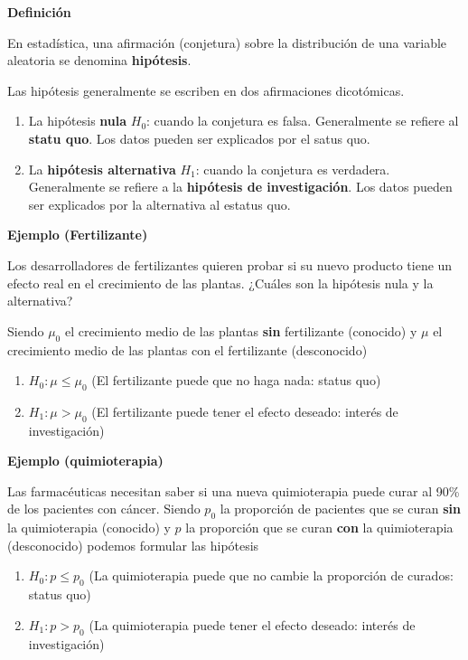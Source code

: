 \documentclass[
]{book}
\providecommand{\tightlist}{%
  \setlength{\itemsep}{0pt}\setlength{\parskip}{0pt}}
\begin{document}
\textbf{Definición}

En estadística, una afirmación (conjetura) sobre la distribución de una variable aleatoria se denomina \textbf{hipótesis}.

Las hipótesis generalmente se escriben en dos afirmaciones dicotómicas.

\begin{enumerate}
\def\labelenumi{\alph{enumi}.}
\item
  La hipótesis \textbf{nula} \(H_0\): cuando la conjetura es falsa. Generalmente se refiere al \textbf{statu quo}. Los datos pueden ser explicados por el satus quo.
\item
  La \textbf{hipótesis alternativa} \(H_1\): cuando la conjetura es verdadera. Generalmente se refiere a la \textbf{hipótesis de investigación}. Los datos pueden ser explicados por la alternativa al estatus quo.
\end{enumerate}

\textbf{Ejemplo (Fertilizante)}

Los desarrolladores de fertilizantes quieren probar si su nuevo producto tiene un efecto real en el crecimiento de las plantas. ¿Cuáles son la hipótesis nula y la alternativa?

Siendo \(\mu_0\) el crecimiento medio de las plantas \textbf{sin} fertilizante (conocido) y \(\mu\) el crecimiento medio de las plantas con el fertilizante (desconocido)

\begin{enumerate}
\def\labelenumi{\alph{enumi}.}
\tightlist
\item
  \(H_0:\mu \leq \mu_0\) (El fertilizante puede que no haga nada: status quo)
\item
  \(H_1:\mu > \mu_0\) (El fertilizante puede tener el efecto deseado: interés de investigación)
\end{enumerate}

\textbf{Ejemplo (quimioterapia)}

Las farmacéuticas necesitan saber si una nueva quimioterapia puede curar al 90\% de los pacientes con cáncer. Siendo \(p_0\) la proporción de pacientes que se curan \textbf{sin} la quimioterapia (conocido) y \(p\) la proporción que se curan \textbf{con} la quimioterapia (desconocido) podemos formular las hipótesis

\begin{enumerate}
\def\labelenumi{\alph{enumi}.}
\tightlist
\item
  \(H_0:p \leq p_0\) (La quimioterapia puede que no cambie la proporción de curados: status quo)
\item
  \(H_1: p > p_0\) (La quimioterapia puede tener el efecto deseado: interés de investigación)
\end{enumerate}
\end{document}
